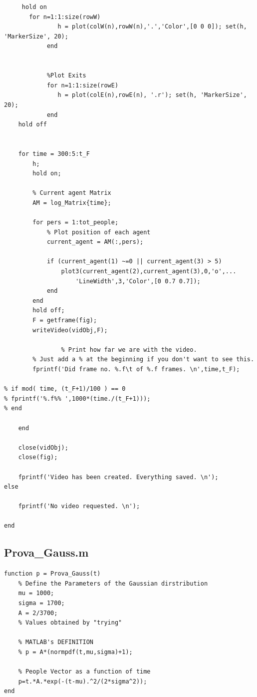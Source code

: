 \documentclass[11pt]{article}
\begin{document}
\begin{lstlisting}[frame=lines]
     %Create Background for the simulation
     hold on
       for n=1:1:size(rowW)
               h = plot(colW(n),rowW(n),'.','Color',[0 0 0]); set(h, 'MarkerSize', 20);
            end


            %Plot Exits
            for n=1:1:size(rowE)
               h = plot(colE(n),rowE(n), '.r'); set(h, 'MarkerSize', 20);
            end
    hold off
    
    
    for time = 300:5:t_F
        h;
        hold on;
                   
        % Current agent Matrix
        AM = log_Matrix{time};
  
        for pers = 1:tot_people;
            % Plot position of each agent
            current_agent = AM(:,pers);
        
            if (current_agent(1) ~=0 || current_agent(3) > 5)
                plot3(current_agent(2),current_agent(3),0,'o',...
                    'LineWidth',3,'Color',[0 0.7 0.7]);
            end
        end
        hold off;
        F = getframe(fig);
        writeVideo(vidObj,F);
        
                % Print how far we are with the video.
        % Just add a % at the beginning if you don't want to see this.
        fprintf('Did frame no. %.f\t of %.f frames. \n',time,t_F);
        
% if mod( time, (t_F+1)/100 ) == 0
% fprintf('%.f%% ',1000*(time./(t_F+1)));
% end
        
    end

    close(vidObj);
    close(fig);

    fprintf('Video has been created. Everything saved. \n');
else
 
    fprintf('No video requested. \n');
    
end
\end{lstlisting}

\subsection*{Prova\_Gauss.m}
\begin{lstlisting}[frame=lines]
% 'Gaussian Distribution' function
function p = Prova_Gauss(t)
    % Define the Parameters of the Gaussian dirstribution
    mu = 1000;
    sigma = 1700;        
    A = 2/3700;
    % Values obtained by "trying"
    
    % MATLAB's DEFINITION
    % p = A*(normpdf(t,mu,sigma)+1);
    
    % People Vector as a function of time
    p=t.*A.*exp(-(t-mu).^2/(2*sigma^2));
end
\end{lstlisting}
\end{document}

